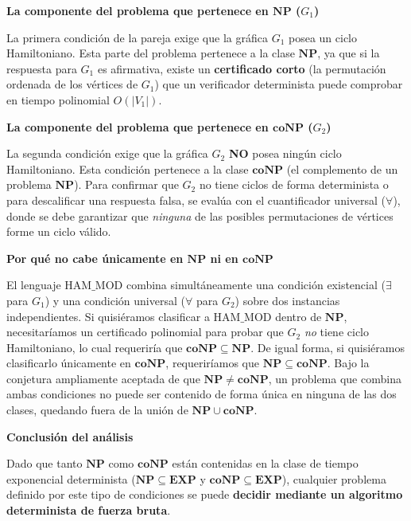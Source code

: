 \begin{itemize}[leftmargin=*]
    \vspace{0.3cm}
    \noindent\textbf{La componente del problema que pertenece en $\mathbf{NP}$ ($G_1$)}

    La primera condición de la pareja exige que la gráfica $G_1$ posea un ciclo Hamiltoniano. 
    Esta parte del problema pertenece a la clase \textbf{$\mathbf{NP}$}, ya que si la respuesta para $G_1$ es afirmativa, existe un \textbf{certificado corto} (la permutación ordenada de los vértices de $G_1$) que un verificador determinista puede comprobar en tiempo polinomial $O(|V_1|)$.

    \vspace{0.3cm}
    \noindent\textbf{La componente del problema que pertenece en $\mathbf{coNP}$ ($G_2$)}

    La segunda condición exige que la gráfica $G_2$ \textbf{NO} posea ningún ciclo Hamiltoniano.
    Esta condición pertenece a la clase \textbf{$\mathbf{coNP}$} (el complemento de un problema $\mathbf{NP}$). Para confirmar que $G_2$ no tiene ciclos de forma determinista o para descalificar una respuesta falsa, se evalúa con el cuantificador universal ($\forall$), donde se debe garantizar que \textit{ninguna} de las posibles permutaciones de vértices forme un ciclo válido.

    \vspace{0.3cm}
    \noindent\textbf{Por qué no cabe únicamente en $\mathbf{NP}$ ni en $\mathbf{coNP}$}

    El lenguaje $\text{HAM\_MOD}$ combina simultáneamente una condición existencial ($\exists$ para $G_1$) y una condición universal ($\forall$ para $G_2$) sobre dos instancias independientes.
    Si quisiéramos clasificar a $\text{HAM\_MOD}$ dentro de \textbf{$\mathbf{NP}$}, necesitaríamos un certificado polinomial para probar que $G_2$ \textit{no} tiene ciclo Hamiltoniano, lo cual requeriría que $\mathbf{coNP} \subseteq \mathbf{NP}$.
    De igual forma, si quisiéramos clasificarlo únicamente en \textbf{$\mathbf{coNP}$}, requeriríamos que $\mathbf{NP} \subseteq \mathbf{coNP}$.
    Bajo la conjetura ampliamente aceptada de que $\mathbf{NP} \neq \mathbf{coNP}$, un problema que combina ambas condiciones no puede ser contenido de forma única en ninguna de las dos clases, quedando fuera de la unión de $\mathbf{NP} \cup \mathbf{coNP}$.

    \vspace{0.3cm}
    \noindent\textbf{Conclusión del análisis}

    Dado que tanto $\mathbf{NP}$ como $\mathbf{coNP}$ están contenidas en la clase de tiempo exponencial determinista ($\mathbf{NP} \subseteq \mathbf{EXP}$ y $\mathbf{coNP} \subseteq \mathbf{EXP}$), cualquier problema definido por este tipo de condiciones se puede \textbf{decidir mediante un algoritmo determinista de fuerza bruta}.


\end{itemize}
